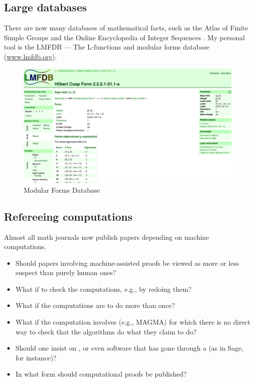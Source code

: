 \subsection {Large databases}
There are now many databases of mathematical facts, such as the Atlas of Finite Simple Groups \cite{Conwayetal1985} and the Online Encyclopedia of Integer Sequences \cite{Sloane2003,Sloane2007}. My personal tool is the LMFDB --- The L-functions and modular forms database (\url{www.lmfdb.org}).
\begin{figure}
	\caption{Modular Forms Database}
\includegraphics[scale=0.25]{LMFDB.png}
\end{figure}

\subsection {Refereeing computations}

Almost all math journals now publish papers depending on machine computations.
\begin{itemize}
\item
Should papers involving machine-assisted proofs 
be viewed as more or less suspect than purely human ones?
\item 
What if  to check the computations,
e.g., by redoing them?
\item 
What if the computations are  to do more than once?
\item 
What if the computation involves  (e.g., MAGMA)
for which there is no direct way to check that the algorithms
do what they claim to do?
\item 
Should one insist on ,
or even software that has gone through a 
(as in Sage, for instance)?
\item
In what form should computational proofs be published?
\end{itemize}

